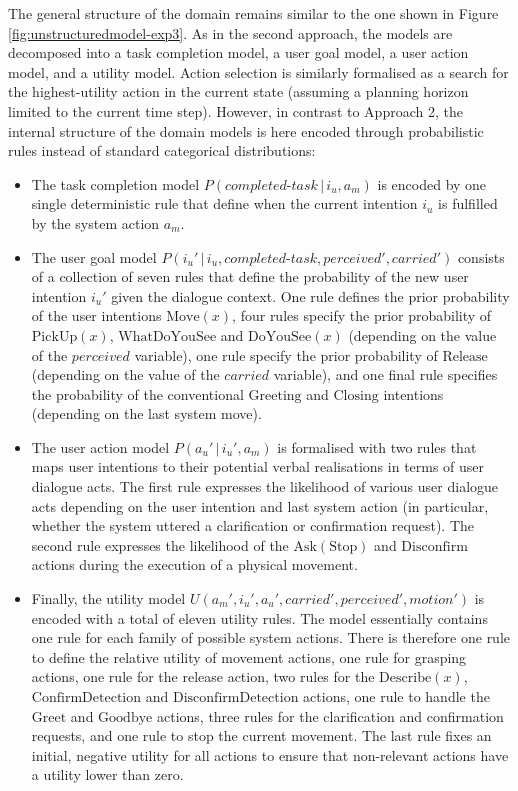The general structure of the domain remains similar to the one shown in Figure \ref{fig:unstructuredmodel-exp3}.  As in the second approach, the models are decomposed into a task completion model, a user goal model, a user action model, and a utility model.  Action selection is similarly formalised as a search for the highest-utility action in the current state (assuming a planning horizon limited to the current time step).  However, in contrast to Approach 2, the internal structure of the domain models is here encoded through probabilistic rules instead of standard categorical distributions:
\begin{itemize}
\item The task completion model $P(\mathit{completed\mbox{-}task}\, | \, i_u, a_m)$ is encoded by one single deterministic rule that define when the current intention $i_u$ is fulfilled by the system action $a_m$. 
\item The user goal model $P(i_u' \, | \, i_u, \mathit{completed\mbox{-}task}, \mathit{perceived'}, \mathit{carried'})$ consists of a collection of seven rules that define the probability of the new user intention $i_u'$ given the dialogue context. One rule defines the prior probability of the user intentions $\mathrm{Move(\mathit{x})}$, four rules specify the prior probability of $\mathrm{PickUp(\mathit{x})}$, $\mathrm{WhatDoYouSee}$ and $\mathrm{DoYouSee(\mathit{x})}$ (depending on the value of the $\mathit{perceived}$ variable), one rule specify the prior probability of $\mathrm{Release}$ (depending on the value of the $\mathit{carried}$ variable), and one final rule specifies the probability of the conventional $\mathrm{Greeting}$ and $\mathrm{Closing}$ intentions (depending on the last system move). 

\item The user action model $P(a_u'\, | \, i_u', a_m)$ is formalised with two rules that maps user intentions to their potential verbal realisations in terms of user dialogue acts. The first rule expresses the likelihood of various user dialogue acts depending on the user intention and last system action (in particular, whether the system uttered a clarification or confirmation request).  The second rule expresses the likelihood of the $\mathrm{Ask(Stop)}$ and $\mathrm{Disconfirm}$ actions during the execution of a physical movement.

\item Finally, the utility model $U(a_m', i_u', a_u', \mathit{carried'}, \mathit{perceived'}, \mathit{motion'})$ is encoded with a total of eleven utility rules.  The model essentially contains one rule for each family of possible system actions.  There is therefore one rule to define the relative utility of movement actions, one rule for grasping actions, one rule for the release action, two rules for the $\mathrm{Describe(\mathit{x})}$, $\mathrm{ConfirmDetection}$ and $\mathrm{DisconfirmDetection}$ actions, one rule to handle the  $\mathrm{Greet}$ and $\mathrm{Goodbye}$ actions, three rules for the clarification and confirmation requests, and one rule to stop the current movement. The last rule fixes an initial, negative utility for all actions to ensure that non-relevant actions have a utility lower than zero.  


\end{itemize}
